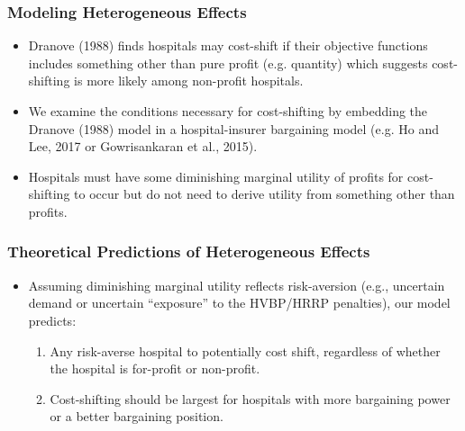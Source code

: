 \documentclass{beamer}
\begin{document}
\begin{frame}
\frametitle{Modeling Heterogeneous Effects}
\begin{itemize}
\item Dranove (1988) finds hospitals may cost-shift if their objective functions includes something other than pure profit (e.g. quantity) which suggests cost-shifting is more likely among non-proﬁt hospitals.
\item We examine the conditions necessary for cost-shifting by embedding the Dranove (1988) model in a hospital-insurer bargaining model (e.g. Ho and Lee, 2017 or Gowrisankaran et al., 2015).
\item Hospitals must have some diminishing marginal utility of profits for cost-shifting to occur but do not need to derive utility from something other than profits.
\end{itemize}
\end{frame}

\begin{frame}
\frametitle{Theoretical Predictions of Heterogeneous Effects}
\begin{itemize}
\item Assuming diminishing marginal utility reflects risk-aversion (e.g., uncertain demand or uncertain “exposure” to the HVBP/HRRP penalties), our model predicts:
\begin{enumerate}
\item Any risk-averse hospital to potentially cost shift, regardless of whether the hospital is for-profit or non-profit. 
\item Cost-shifting should be largest for hospitals with more bargaining power or a better bargaining position.
\end{enumerate}
\end{itemize}
\end{frame}
\end{document}

